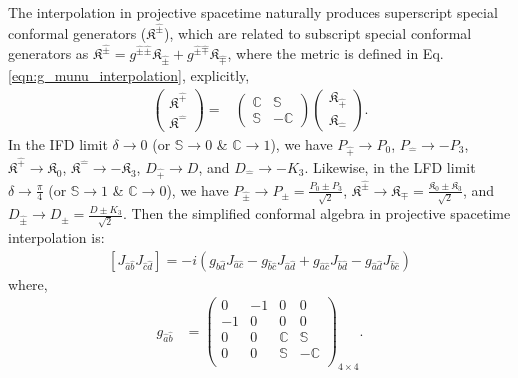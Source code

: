 \documentclass[%
 reprint,
superscriptaddress,
 amsmath,amssymb,
 aps,
]{revtex4-2}
\begin{document}
The interpolation in projective spacetime naturally produces superscript special conformal generators  ($\mathfrak{K}^{\hat{\pm}}$), which are related to subscript special conformal generators as $\mathfrak{K}^{\hat{\pm}}=g^{\hat{\pm}\hat{\pm}}\mathfrak{K}_{\hat{\pm}}+g^{\hat{\pm}\hat{\mp}}\mathfrak{K}_{\hat{\mp}}$, where the metric is defined in Eq.\eqref{eqn:g_munu_interpolation}, explicitly,
\begin{align}
    \begin{pmatrix}
        \mathfrak{K}^{\hat{+}}\\
        \mathfrak{K}^{\hat{-}}
    \end{pmatrix}=&\begin{pmatrix}
        \mathbb{C}&\mathbb{S}\\
        \mathbb{S}&-\mathbb{C}
    \end{pmatrix}\begin{pmatrix}
        \mathfrak{K}_{\hat{+}}\\
        \mathfrak{K}_{\hat{-}}
    \end{pmatrix}.
\end{align}
%
In the IFD limit $\delta\rightarrow0$ (or $\mathbb{S}\rightarrow0$ \& $\mathbb{C}\rightarrow1$), we have $P_{\hat{+}}\rightarrow P_{0}$, $P_{\hat{-}}\rightarrow -P_{3}$, $\mathfrak{K}^{\hat{+}}\rightarrow \mathfrak{K}_{0}$, $\mathfrak{K}^{\hat{-}}\rightarrow -\mathfrak{K}_{3}$, $D_{\hat{+}}\rightarrow D$, and $D_{\hat{-}}\rightarrow -K_{3}$. Likewise, in the LFD limit $\delta\rightarrow\frac{\pi}{4}$ (or $\mathbb{S}\rightarrow1$ \& $\mathbb{C}\rightarrow0$), we have $P_{\hat{\pm}}\rightarrow P_{\pm}=\frac{P_0\pm P_3}{\sqrt{2}}$, $\mathfrak{K}^{\hat{\pm}}\rightarrow \mathfrak{K}_{\mp}=\frac{\mathfrak{K}_0\pm \mathfrak{K}_3}{\sqrt{2}}$, and $D_{\hat{\pm}}\rightarrow D_{\pm}=\frac{D \pm K_3}{\sqrt{2}}$. Then the simplified conformal algebra in projective spacetime interpolation is:
  \begin{align}
      \left[J_{{\hat{a}}{\hat{b}}}J_{{\hat{c}}{\hat{d}}}\right]=-i\left(g_{{\hat{b}}{\hat{d}}}J_{{\hat{a}}{\hat{c}}}-g_{{\hat{b}}{\hat{c}}}J_{{\hat{a}}{\hat{d}}}+g_{{\hat{a}}{\hat{c}}}J_{{\hat{b}}{\hat{d}}}-g_{{\hat{a}}{\hat{d}}}J_{{\hat{b}}{\hat{c}}}\right)\label{simplesrint}
  \end{align}
where, 
\begin{align}
    g_{\hat{a}\hat{b}}&=\begin{pmatrix}
  0&-1&0&0\\
  -1&0&0&0\\
  0&0&\mathbb{C}&\mathbb{S}\\
  0&0&\mathbb{S}&-\mathbb{C}\\
  \end{pmatrix}_{4\times4}\label{metricghat}.
\end{align}
\end{document}
